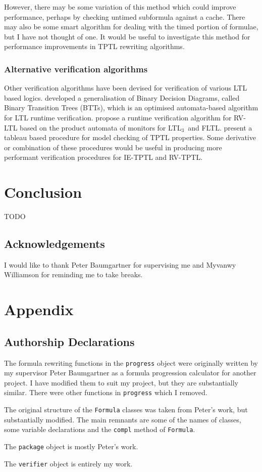 \documentclass[a4paper]{article}
\newcommand{\ltlt}{LTL$_3$}
\begin{document}
However, there may be some variation of this method which could improve performance, perhaps by checking untimed subformula against a cache. There may also be some smart algorithm for dealing with the timed portion of formulae, but I have not thought of one. It would be useful to investigate this method for performance improvements in TPTL rewriting algorithms.

\subsubsection{Alternative verification algorithms}
Other verification algorithms have been devised for verification of various LTL based logics. \textcite{rosu2005rewriting} developed a generalisation of Binary Decision Diagrams, called Binary Transition Trees (BTTs), which is an optimised automata-based algorithm for LTL runtime verification. \textcite{bauer2010comparing} propose a runtime verification algorithm for RV-LTL based on the product automata of monitors for \ltlt\ and FLTL. \textcite{alur1994really} present a tableau based procedure for model checking of TPTL properties.
Some derivative or combination of these procedures would be useful in producing more performant verification procedures for IE-TPTL and RV-TPTL.


\section{Conclusion}
TODO
\subsection{Acknowledgements}
I would like to thank Peter Baumgartner for supervising me and Myvanwy Williamson for reminding me to take breaks.

\nocite{*}
\printbibliography{}
\newpage
\section{Appendix}\label{appendix}
\subsection{Authorship Declarations}
The formula rewriting functions in the \texttt{progress} object were originally written by my supervisor Peter Baumgartner as a formula progression calculator for another project. I have modified them to suit my project, but they are substantially similar. There were other functions in \texttt{progress} which I removed.

The original structure of the \texttt{Formula} classes was taken from Peter's work, but substantially modified. The main remnants are some of the names of classes, some variable declarations and the \texttt{compl} method of \texttt{Formula}.

The \texttt{package} object is mostly Peter's work.

The \texttt{verifier} object is entirely my work.
\end{document}
